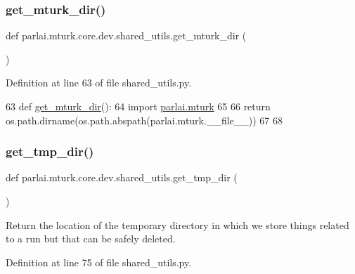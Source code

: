 \subsubsection{\texorpdfstring{get\+\_\+mturk\+\_\+dir()}{get\_mturk\_dir()}}
{\footnotesize\ttfamily def parlai.\+mturk.\+core.\+dev.\+shared\+\_\+utils.\+get\+\_\+mturk\+\_\+dir (\begin{DoxyParamCaption}{ }\end{DoxyParamCaption})}



Definition at line 63 of file shared\+\_\+utils.\+py.


\begin{DoxyCode}
63 \textcolor{keyword}{def }\hyperlink{namespaceparlai_1_1mturk_1_1core_1_1shared__utils_aabd480fc6090e1fa769ff3926f7e842d}{get\_mturk\_dir}():
64     \textcolor{keyword}{import} \hyperlink{namespaceparlai_1_1mturk}{parlai.mturk}
65 
66     \textcolor{keywordflow}{return} os.path.dirname(os.path.abspath(parlai.mturk.\_\_file\_\_))
67 
68 
\end{DoxyCode}
\mbox{\label{namespaceparlai_1_1mturk_1_1core_1_1dev_1_1shared__utils_a3bb51eaf0110918e082cae3ffd14d4d0}} 
\subsubsection{\texorpdfstring{get\+\_\+tmp\+\_\+dir()}{get\_tmp\_dir()}}
{\footnotesize\ttfamily def parlai.\+mturk.\+core.\+dev.\+shared\+\_\+utils.\+get\+\_\+tmp\+\_\+dir (\begin{DoxyParamCaption}{ }\end{DoxyParamCaption})}

\begin{DoxyVerb}Return the location of the temporary directory in which we store things related to a
run but that can be safely deleted.
\end{DoxyVerb}
 

Definition at line 75 of file shared\+\_\+utils.\+py.


